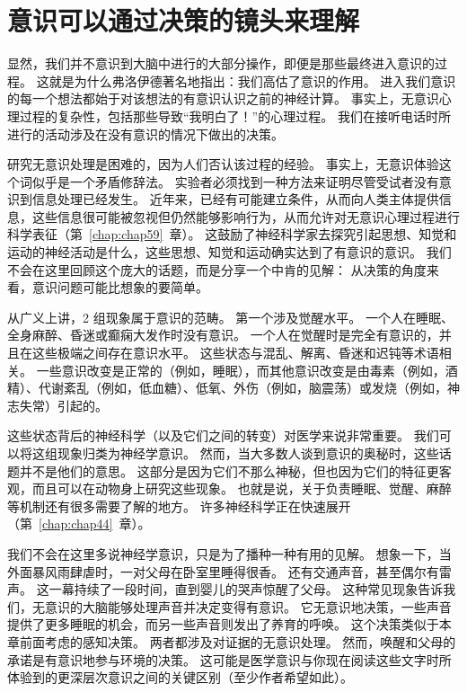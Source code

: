 \section{意识可以通过决策的镜头来理解}

显然，我们并不意识到大脑中进行的大部分操作，即便是那些最终进入意识的过程。
这就是为什么弗洛伊德著名地指出：我们高估了意识的作用。
进入我们意识的每一个想法都始于对该想法的有意识认识之前的神经计算。
事实上，无意识心理过程的复杂性，包括那些导致“我明白了！”的心理过程。
我们在接听电话时所进行的活动涉及在没有意识的情况下做出的决策。


研究无意识处理是困难的，因为人们否认该过程的经验。
事实上，无意识体验这个词似乎是一个矛盾修辞法。
实验者必须找到一种方法来证明尽管受试者没有意识到信息处理已经发生。
近年来，已经有可能建立条件，从而向人类主体提供信息，这些信息很可能被忽视但仍然能够影响行为，从而允许对无意识心理过程进行科学表征（第~\ref{chap:chap59}~章）。
这鼓励了神经科学家去探究引起思想、知觉和运动的神经活动是什么，这些思想、知觉和运动确实达到了有意识的意识。
我们不会在这里回顾这个庞大的话题，而是分享一个中肯的见解：
从决策的角度来看，意识问题可能比想象的要简单。


从广义上讲，2 组现象属于意识的范畴。
第一个涉及觉醒水平。
一个人在睡眠、全身麻醉、昏迷或癫痫大发作时没有意识。
一个人在觉醒时是完全有意识的，并且在这些极端之间存在意识水平。
这些状态与混乱、解离、昏迷和迟钝等术语相关。
一些意识改变是正常的（例如，睡眠），而其他意识改变是由毒素（例如，酒精）、代谢紊乱（例如，低血糖）、低氧、外伤（例如，脑震荡）或发烧（例如，神志失常）引起的。


这些状态背后的神经科学（以及它们之间的转变）对医学来说非常重要。
我们可以将这组现象归类为神经学意识。
然而，当大多数人谈到意识的奥秘时，这些话题并不是他们的意思。
这部分是因为它们不那么神秘，但也因为它们的特征更客观，而且可以在动物身上研究这些现象。
也就是说，关于负责睡眠、觉醒、麻醉等机制还有很多需要了解的地方。
许多神经科学正在快速展开（第~\ref{chap:chap44}~章）。


我们不会在这里多说神经学意识，只是为了播种一种有用的见解。
想象一下，当外面暴风雨肆虐时，一对父母在卧室里睡得很香。
还有交通声音，甚至偶尔有雷声。
这一幕持续了一段时间，直到婴儿的哭声惊醒了父母。
这种常见现象告诉我们，无意识的大脑能够处理声音并决定变得有意识。
它无意识地决策，一些声音提供了更多睡眠的机会，而另一些声音则发出了养育的呼唤。
这个决策类似于本章前面考虑的感知决策。
两者都涉及对证据的无意识处理。
然而，唤醒和父母的承诺是有意识地参与环境的决策。
这可能是医学意识与你现在阅读这些文字时所体验到的更深层次意识之间的关键区别（至少作者希望如此）。


